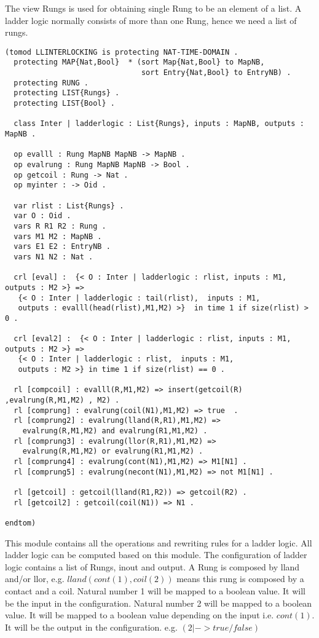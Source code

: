 \documentclass{article}
\begin{document}
The view Rungs is used for obtaining single Rung to be an element of a list. A ladder logic normally consists of more than one Rung, hence we need a list of rungs.

\begin{verbatim}
(tomod LLINTERLOCKING is protecting NAT-TIME-DOMAIN . 
  protecting MAP{Nat,Bool}  * (sort Map{Nat,Bool} to MapNB,
                               sort Entry{Nat,Bool} to EntryNB) .
  protecting RUNG .
  protecting LIST{Rungs} .
  protecting LIST{Bool} .

  class Inter | ladderlogic : List{Rungs}, inputs : MapNB, outputs : MapNB .
  
  op evalll : Rung MapNB MapNB -> MapNB .
  op evalrung : Rung MapNB MapNB -> Bool .
  op getcoil : Rung -> Nat .  
  op myinter : -> Oid .

  var rlist : List{Rungs} .
  var O : Oid .
  vars R R1 R2 : Rung .
  vars M1 M2 : MapNB .
  vars E1 E2 : EntryNB .
  vars N1 N2 : Nat .

  crl [eval] :  {< O : Inter | ladderlogic : rlist, inputs : M1, outputs : M2 >} => 
   {< O : Inter | ladderlogic : tail(rlist),  inputs : M1, 
   outputs : evalll(head(rlist),M1,M2) >}  in time 1 if size(rlist) > 0 .

  crl [eval2] :  {< O : Inter | ladderlogic : rlist, inputs : M1, outputs : M2 >} => 
   {< O : Inter | ladderlogic : rlist,  inputs : M1, 
   outputs : M2 >} in time 1 if size(rlist) == 0 .
  
  rl [compcoil] : evalll(R,M1,M2) => insert(getcoil(R) ,evalrung(R,M1,M2) , M2) .
  rl [comprung] : evalrung(coil(N1),M1,M2) => true  .
  rl [comprung2] : evalrung(lland(R,R1),M1,M2) => 
  	evalrung(R,M1,M2) and evalrung(R1,M1,M2) .
  rl [comprung3] : evalrung(llor(R,R1),M1,M2) => 
  	evalrung(R,M1,M2) or evalrung(R1,M1,M2) .
  rl [comprung4] : evalrung(cont(N1),M1,M2) => M1[N1] .
  rl [comprung5] : evalrung(necont(N1),M1,M2) => not M1[N1] .

  rl [getcoil] : getcoil(lland(R1,R2)) => getcoil(R2) .
  rl [getcoil2] : getcoil(coil(N1)) => N1 . 
  
endtom)
\end{verbatim}
This module contains all the operations and rewriting rules for a ladder logic. All ladder logic can be computed based on this module. The configuration of ladder logic contains a list of Rungs, inout and output. A Rung is composed by lland and/or llor, e.g. $lland(cont(1),coil(2))$ means this rung is composed by a contact and a coil. Natural number 1 will be mapped to a boolean value. It will be the input in the configuration.  Natural number 2 will be mapped to a boolean value. It will be mapped to a boolean value depending on the input i.e. $cont(1)$. It will be the output in the configuration. e.g. $(2|->true/false)$
\end{document}
